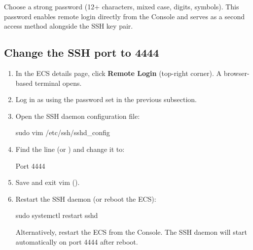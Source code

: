 \documentclass{guide}
\begin{document}
\begin{warning}
Choose a strong password (12+ characters, mixed case, digits, symbols).
This password enables remote login directly from the Console and serves as
a second access method alongside the SSH key pair.
\end{warning}

\subsection{Change the SSH port to 4444}


\stepbystep
\begin{enumerate}
  \item In the ECS details page, click \textbf{Remote Login} (top-right
        corner). A browser-based terminal opens.

  \item Log in as  using the password set in the previous
        subsection.
  \item Open the SSH daemon configuration file:

  \begin{code}[bash]
sudo vim /etc/ssh/sshd_config
  \end{code}

  \item Find the line  (or ) and change it
        to:

  \begin{code}
Port 4444
  \end{code}

  \item Save and exit vim ().
  \item Restart the SSH daemon (or reboot the ECS):

  \begin{code}[bash]
sudo systemctl restart sshd
  \end{code}

  \begin{tip}
  Alternatively, restart the ECS from the Console. The SSH daemon will
  start automatically on port 4444 after reboot.
  \end{tip}
\end{enumerate}
\end{document}
